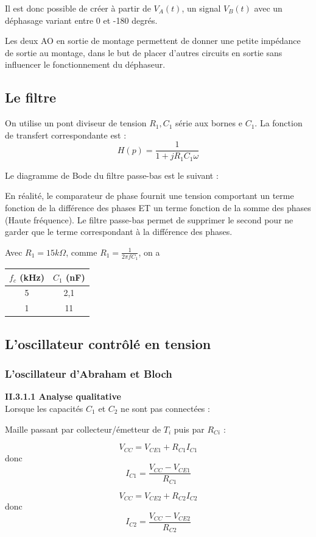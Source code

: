 \documentclass[../../Cours_M1.tex]{subfiles}
\begin{document}
Il est donc possible de créer à partir de $V_A(t)$, un signal $V_B(t)$  avec un déphasage variant entre 0 et -180 degrés.

Les deux AO en sortie de montage permettent de donner une petite impédance de sortie au montage, dans le but de placer d'autres circuits en sortie sans influencer le fonctionnement du déphaseur.

\subsection{Le filtre}

On utilise un pont diviseur de tension $R_1,C_1$ série aux bornes e $C_1$. La fonction de transfert correspondante est :
\[H(p) = \frac{1}{1+jR_1C_1\omega} \]

Le diagramme de Bode du filtre passe-bas est le suivant :

En réalité, le comparateur de phase fournit une tension comportant un terme fonction de la différence des phases ET un terme fonction de la somme des phases (Haute fréquence). Le filtre passe-bas permet de supprimer le second pour ne garder que le terme correspondant à la différence des phases.

Avec  $R_1 = 15 k\Omega$, comme $R_1 = \frac{1}{2\pi f C_1}$, on a
\begin{center}
\begin{tabular}{|c|c|}
\hline
$f_c$ (kHz) & $C_1$ (nF) \\
\hline
5 & 2,1 \\
\hline
1 & 11 \\
\hline
\end{tabular}
\end{center}

\subsection{L'oscillateur contrôlé en tension}

\subsubsection{L'oscillateur d'Abraham et Bloch}

\textbf{II.3.1.1 Analyse qualitative} \\

\noindent Lorsque les capacités $C_1$ et $C_2$ ne sont pas connectées :

Maille passant par collecteur/émetteur de $T_i$ puis par $R_{Ci}$ :
\begin{multicols}{2}
\[V_{CC} = V_{CE1} + R_{C1}I_{C1} \]
donc
\[I_{C1} = \frac{V_{CC}-V_{CE1}}{R_{C1}}\]

\[V_{CC} = V_{CE2} + R_{C2}I_{C2} \]
donc
\[I_{C2} = \frac{V_{CC}-V_{CE2}}{R_{C2}}\]
\end{multicols}
\end{document}
